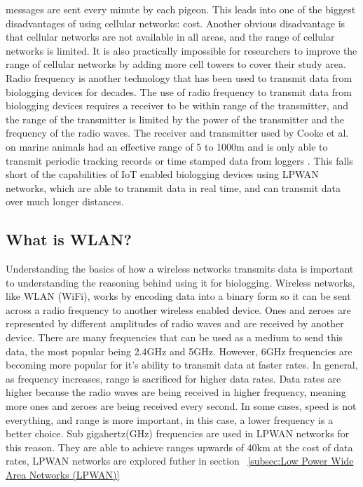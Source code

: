 \documentclass[sigplan,screen,nonacm]{acmart}
\begin{document}
messages are sent every minute by each pigeon\cite{Martin_2006}. This leads into one of the biggest
disadvantages of using cellular networks: cost. Another obvious disadvantage
is that cellular networks are not available in all areas, and the range of
cellular networks is limited. It is also practically impossible for researchers
to improve the range of cellular networks by adding more cell towers to cover
their study area. Radio frequency is another technology that has been used to
transmit data from biologging devices for decades. The use of radio frequency
to transmit data from biologging devices requires a receiver to be within range
of the transmitter, and the range of the transmitter is limited by the power of
the transmitter and the frequency of the radio waves. The receiver and transmitter
used by Cooke et al. on marine animals had an effective range of 5 to 1000m and 
is only able to transmit periodic tracking records or time stamped data from loggers
\cite{cooke2012biotelemetry}. This falls short of the capabilities of IoT enabled 
biologging devices using LPWAN networks, which are able to transmit data in real time, and can transmit 
data over much longer distances. 

\subsection{What is WLAN?}
\label{subsec:What is WLAN?}

Understanding the basics of how a wireless networks transmits data is important to understanding 
the reasoning behind using it for biologging. Wireless networks, like WLAN (WiFi), 
works by encoding data into a binary form so it can be sent across a radio frequency to another 
wireless enabled device. Ones and zeroes are represented by different amplitudes of radio waves 
and are received by another device\cite{Ghimire_2023}. There are many frequencies that can 
be used as a medium to send this data, the most popular being 2.4GHz and 5GHz. However, 6GHz 
frequencies are becoming more popular for it's ability to transmit data at faster rates. In general, 
as frequency increases, range is sacrificed for higher data rates\cite{Netgear}. Data rates are 
higher because the radio waves are being received in higher 
frequency, meaning more ones and zeroes are being received every second. In 
some cases, speed is not everything, and range is more important, in this case, a lower frequency 
is a better choice. Sub gigahertz(GHz) frequencies are used in LPWAN networks for this reason. They 
are able to achieve ranges upwards of 40km at the cost of data rates, LPWAN networks are explored futher 
in section ~\ref{subsec:Low Power Wide Area Networks (LPWAN)}
\end{document}
